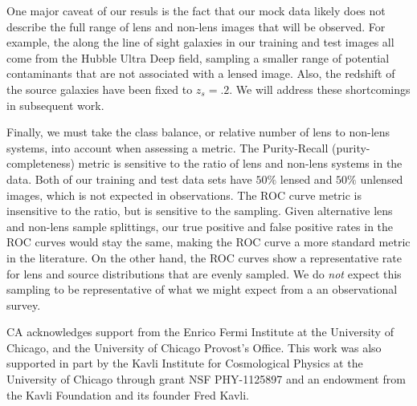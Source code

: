 \documentclass{emulateapj}
\begin{document}
One major caveat of our resuls is the fact that our mock data likely
does not describe the full range of lens and non-lens images that will
be observed.  For example, the along the line of sight galaxies in our
training and test images all come from the Hubble Ultra Deep field,
sampling a smaller range of potential contaminants that are not
associated with a lensed image.  Also, the redshift of the source
galaxies have been fixed to $z_s=.2$.  We will address these
shortcomings in subsequent work.

Finally, we must take the class balance, or relative number of lens to
non-lens systems, into account when assessing a metric.  The
Purity-Recall (purity-completeness) metric is sensitive to the ratio
of lens and non-lens systems in the data.  Both of our training and
test data sets have $50\%$ lensed and $50\%$ unlensed images, which is
not expected in observations.  The ROC curve metric is insensitive to
the ratio, but is sensitive to the sampling.  Given alternative lens
and non-lens sample splittings, our true positive and false positive
rates in the ROC curves would stay the same, making the ROC curve a
more standard metric in the literature.  On the other hand, the ROC
curves show a representative rate for lens and source distributions
that are evenly sampled.  We do {\it not} expect this sampling to be
representative of what we might expect from a an observational survey.


\acknowledgments CA acknowledges support from the Enrico Fermi
Institute at the University of Chicago, and the University of Chicago
Provost's Office. This work was also supported in part by the Kavli
Institute for Cosmological Physics at the University of Chicago
through grant NSF PHY-1125897 and an endowment from the Kavli
Foundation and its founder Fred Kavli.
\lastpagefootnotes




\end{document}
